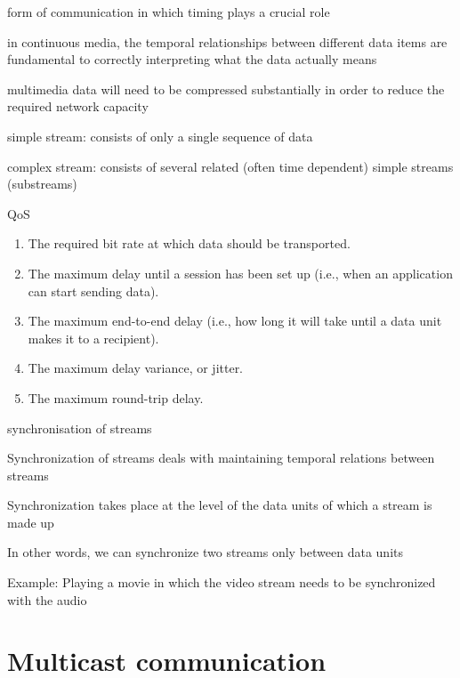 \documentclass[ngerman,a4paper]{report}
\begin{document}
\begin{compactitem}
	\item form of communication in which timing plays a crucial role
	\item in continuous media, the temporal relationships between different data items are fundamental to correctly interpreting what the data actually means
	\item multimedia data will need to be compressed substantially in order to reduce the required network capacity
	\item simple stream: consists of only a single sequence of data
	\item complex stream: consists of several related (often time dependent) simple streams (substreams)
	\item QoS
		\begin{enumerate}
			\item The required bit rate at which data should be transported. 
			\item The maximum delay until a session has been set up (i.e., when an application can start sending data). 
			\item The maximum end-to-end delay (i.e., how long it will take until a data unit makes it to a recipient). 
			\item The maximum delay variance, or jitter. 
			\item The maximum round-trip delay.		
		\end{enumerate}

	\item synchronisation of streams
	\begin{compactitem}
		\item Synchronization of streams deals with maintaining temporal relations between streams
		\item Synchronization takes place at the level of the data units of which a stream is made up
		\item In other words, we can synchronize two streams only between data units
		\item Example: Playing a movie in which the video stream needs to be synchronized with the audio
	\end{compactitem}
	
\end{compactitem}


\section{Multicast communication}
\end{document}
